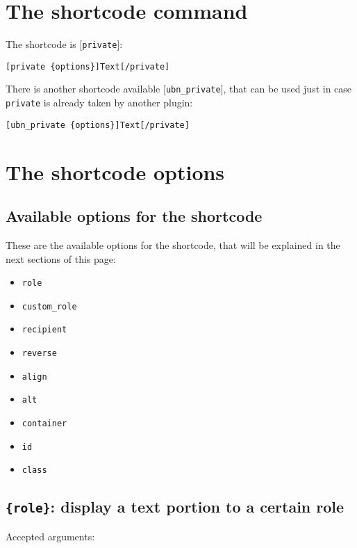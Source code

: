 \section{The shortcode command}

The shortcode is [\verb+private+]:

\begin{lstlisting}
[private {options}]Text[/private]
\end{lstlisting}

There is another shortcode available [\verb+ubn_private+], that can be used just
in case \verb+private+ is already taken by another plugin:

\begin{lstlisting}
[ubn_private {options}]Text[/private]
\end{lstlisting}

\section{The shortcode options}

\subsection{Available options for the shortcode}

These are the available options for the shortcode, that will be explained in the
next sections of this page:

\begin{itemize}
 \item \verb+role+
 \item \verb+custom_role+
 \item \verb+recipient+
 \item \verb+reverse+
 \item \verb+align+
 \item \verb+alt+
 \item \verb+container+
 \item \verb+id+
 \item \verb+class+
\end{itemize}

\subsection{\texttt{\{role\}}: display a text portion to a certain role}

Accepted arguments:


